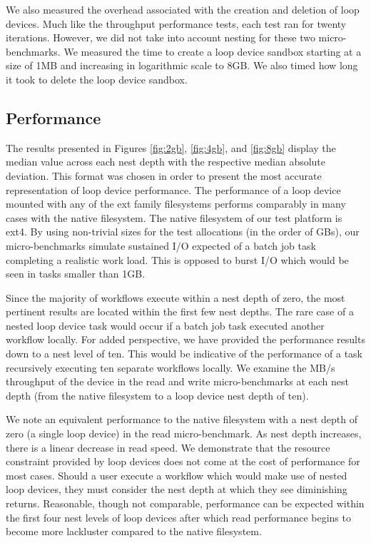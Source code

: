 \documentclass[conference]{IEEEtran}
\begin{document}
We also measured the overhead associated with the creation and deletion of loop devices. Much like the throughput performance tests, each test ran for twenty iterations. However, we did not take into account nesting for these two micro-benchmarks. We measured the time to create a loop device sandbox starting at a size of 1MB and increasing in logarithmic scale to 8GB. We also timed how long it took to delete the loop device sandbox.

\subsection{Performance}
The results presented in Figures \ref{fig:2gb}, \ref{fig:4gb}, and \ref{fig:8gb} display the median value across each nest depth with the respective median absolute deviation. This format was chosen in order to present the most accurate representation of loop device performance. The performance of a loop device mounted with any of the ext family filesystems performs comparably in many cases with the native filesystem. The native filesystem of our test platform is ext4. By using non-trivial sizes for the test allocations (in the order of GBs), our micro-benchmarks simulate sustained I/O expected of a batch job task completing a realistic work load. This is opposed to burst I/O which would be seen in tasks smaller than 1GB. 

Since the majority of workflows execute within a nest depth of zero, the most pertinent results are located within the first few nest depths. The rare case of a nested loop device task would occur if a batch job task executed another workflow locally. For added perspective, we have provided the performance results down to a nest level of ten. This would be indicative of the performance of a task recursively executing ten separate workflows locally. 
We examine the MB/s throughput of the device in the read and write micro-benchmarks at each nest depth (from the native filesystem to a loop device nest depth of ten).

We note an equivalent performance to the native filesystem with a nest depth of zero (a single loop device) in the read micro-benchmark. As nest depth increases, there is a linear decrease in read speed. We demonstrate that the resource constraint provided by loop devices does not come at the cost of performance for most cases. Should a user execute a workflow which would make use of nested loop devices, they must consider the nest depth at which they see diminishing returns. Reasonable, though not comparable, performance can be expected within the first four nest levels of loop devices after which read performance begins to become more lackluster compared to the native filesystem.
\end{document}

